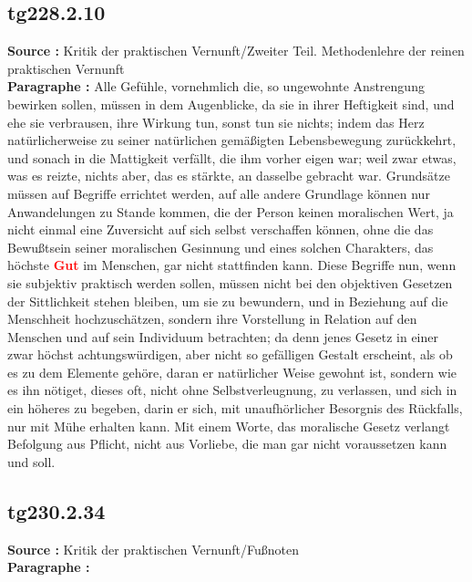 \documentclass[a4paper,12pt,twoside]{book}
\newcommand{\match}[1]{\textcolor{red}{\textbf{#1}}}
\begin{document}
	\subsection*{tg228.2.10} 
	\textbf{Source : }Kritik der praktischen Vernunft/Zweiter Teil. Methodenlehre der reinen praktischen Vernunft\\  
	
	\noindent\textbf{Paragraphe : }Alle Gefühle, vornehmlich die, so ungewohnte Anstrengung bewirken sollen, müssen in dem Augenblicke, da sie in ihrer Heftigkeit sind, und ehe sie verbrausen, ihre Wirkung tun, sonst tun sie nichts; indem das Herz natürlicherweise zu seiner natürlichen gemäßigten Lebensbewegung zurückkehrt, und sonach in die Mattigkeit verfällt, die ihm vorher eigen war; weil zwar etwas, was es reizte, nichts aber, das es stärkte, an dasselbe gebracht war. Grundsätze müssen auf Begriffe errichtet werden, auf alle andere Grundlage können nur Anwandelungen zu Stande kommen, die der Person keinen moralischen Wert, ja nicht einmal eine Zuversicht auf sich selbst verschaffen können, ohne die das Bewußtsein seiner moralischen Gesinnung und eines solchen Charakters, das höchste \match{Gut} im Menschen, gar nicht stattfinden  kann. Diese Begriffe nun, wenn sie subjektiv praktisch werden sollen, müssen nicht bei den objektiven Gesetzen der Sittlichkeit stehen bleiben, um sie zu bewundern, und in Beziehung auf die Menschheit hochzuschätzen, sondern ihre Vorstellung in Relation auf den Menschen und auf sein Individuum betrachten; da denn jenes Gesetz in einer zwar höchst achtungswürdigen, aber nicht so gefälligen Gestalt erscheint, als ob es zu dem Elemente gehöre, daran er natürlicher Weise gewohnt ist, sondern wie es ihn nötiget, dieses oft, nicht ohne Selbstverleugnung, zu verlassen, und sich in ein höheres zu begeben, darin er sich, mit unaufhörlicher Besorgnis des Rückfalls, nur mit Mühe erhalten kann. Mit einem Worte, das moralische Gesetz verlangt Befolgung aus Pflicht, nicht aus Vorliebe, die man gar nicht voraussetzen kann und soll. 
	
	\subsection*{tg230.2.34} 
	\textbf{Source : }Kritik der praktischen Vernunft/Fußnoten\\  
	
	\noindent\textbf{Paragraphe : }
	
\end{document}
